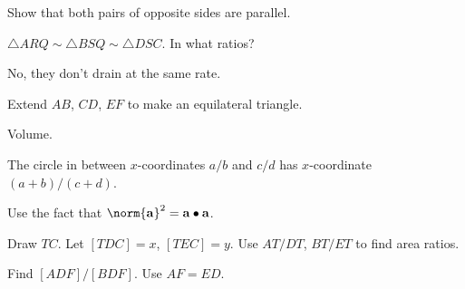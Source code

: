 \documentclass[11pt,paper=letter]{scrartcl}
\begin{document}
\begin{enumthin}[leftmargin=0pt]
\item \label{h:vs02} Show that both pairs of opposite sides are parallel.
\item \label{h:rd51} $\triangle ARQ \sim \triangle BSQ \sim \triangle DSC$. In what ratios?
\item \label{h:an41} No, they don't drain at the same rate.
\item \label{h:gb82} Extend $AB$, $CD$, $EF$ to make an equilateral triangle.
\item \label{h:dg41} Volume.
\item \label{h:dt42} The circle in between $x$-coordinates $a/b$ and $c/d$ has $x$-coordinate $(a+b)/(c+d)$.
\item \label{h:eq21} Use the fact that $\norm{\mathbf a}^2 = \mathbf a \bullet \mathbf a$.
\item \label{h:rt53} Draw $TC$. Let $[TDC] = x$, $[TEC] = y$. Use $AT/DT$, $BT/ET$ to find area ratios.
\item \label{h:gbx1} Find $[ADF]/[BDF]$. Use $AF = ED$.
\end{enumthin}
\end{document}
